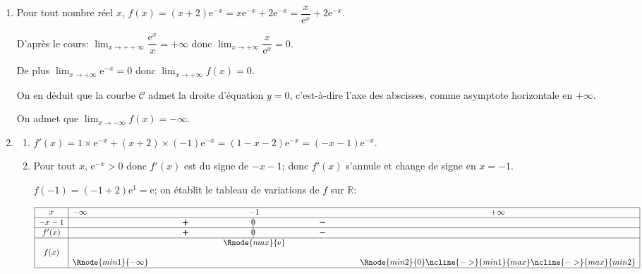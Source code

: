 \documentclass[10pt]{article}
\providecommand{\R}{\mathbb{R}}
\providecommand{\e}{{\mathrm{e}}}
\begin{document}
\medskip

\begin{enumerate}
\item Pour tout nombre réel $x$, $f(x) = (x + 2)\e^{-x}=x\e^{-x}+2\e^{-x}
= \dfrac{x}{\e^{x}}+ 2\e^{-x}$.



D'après le cours: $\displaystyle\lim_{x \to ++ \infty} \dfrac{\e^{x}}{x}= +\infty$ donc  $\displaystyle\lim_{x \to + \infty} \dfrac{x}{\e^{x}}= 0$.

De plus $\displaystyle\lim_{x \to + \infty} \e^{-x}= 0$ donc $\displaystyle\lim_{x \to + \infty} f(x) = 0$.



On en déduit que la courbe $\mathcal{C}$ admet la droite d'équation $y=0$, c'est-à-dire l'axe des abscisses, comme asymptote horizontale en $+\infty$.

On admet que $\displaystyle\lim_{x \to - \infty} f(x) = - \infty$.
\item 
	\begin{enumerate}
		\item
$f'(x)=1\times \e^{-x} + (x+2)\times (-1)\e^{-x} = (1-x-2) \e^{-x}=(-x-1)\e^{-x}$. 		
		
		\item
Pour tout $x$, $\e^{-x}>0$ donc $f'(x)$ est du signe de $-x-1$; donc $f'(x)$ s'annule et change de signe en $x=-1$.

$f(-1) = (-1+2)\e^{1}=\e$; on établit le tableau de variations de $f$ sur $\R$:

\begin{center}
{\renewcommand{\arraystretch}{1.5}
\def\esp{\hspace*{2.5cm}}
\def\hauteur{0pt}
$\begin{array}{|c|l*4{c}|}
\hline
x & -\infty  & \esp & -1 & \esp & +\infty \\ 
\hline
-x-1 &    &   \pmb{+} & \vline\hspace{-2.7pt}0 & \pmb{-} & \\ 
\hline
f'(x) &    &   \pmb{+} & \vline\hspace{-2.7pt}0 & \pmb{-} & \\ 
\hline
 &  &  &   \Rnode{max}{\e}  &  &  \rule{0pt}{\hauteur} \\  
f(x) &   &     &  &  &  \rule{0pt}{\hauteur} \\ 
 &  \Rnode{min1}{-\infty} &   &  &  &   \Rnode{min2}{0} \rule{0pt}{\hauteur}    
 \ncline{->}{min1}{max} 
 \ncline{->}{max}{min2} 
 \\ 
\hline
\end{array} $
}
\end{center}	
	

\end{enumerate}
\end{enumerate}
\end{document}
